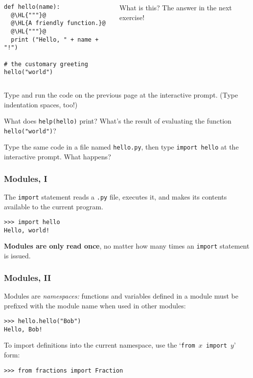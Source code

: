 \documentclass[english,serif,mathserif,xcolor=pdftex,dvipsnames,table]{beamer}
\begin{document}
\begin{frame}[fragile]
  \begin{columns}[t]
    \begin{column}{0.5\textwidth}
\begin{lstlisting}
def hello(name):
  @\HL{"""}@
  @\HL{A friendly function.}@
  @\HL{"""}@
  print ("Hello, " + name + "!")

# the customary greeting
hello("world")
\end{lstlisting}
    \end{column}
    \begin{column}{0.5\textwidth}
      \raggedleft 
      What is this? The answer in the next exercise!
    \end{column}
  \end{columns}
\end{frame}

\begin{frame}
  \begin{exercise}
    Type and run the code on the previous page at the interactive
    prompt. (Type indentation spaces, too!)
    
    What does \texttt{help(hello)} print?  
    What's the result of evaluating the function \texttt{hello("world")}?
  \end{exercise}

  \+
  \begin{exercise}
    Type the same code in a file named \texttt{hello.py}, then type
    \texttt{import hello} at the interactive prompt.
    What happens?
  \end{exercise}  
\end{frame}


\begin{frame}[fragile]
  \frametitle{Modules, I}
  The \texttt{import} statement reads a \texttt{.py} file, executes
  it, and makes its contents available to the current program.
\begin{lstlisting}
>>> import hello
Hello, world!
\end{lstlisting}

  \+
  \textbf{Modules are only read once}, no matter how many times an
  \texttt{import} statement is issued.
\end{frame}


\begin{frame}[fragile]
  \frametitle{Modules, II}
  Modules are \emph{namespaces:} functions and variables defined in
  a module must be prefixed with the module name when used in other
  modules:
\begin{lstlisting}
>>> hello.hello("Bob")
Hello, Bob!
\end{lstlisting}

  \+
  To import definitions into the current namespace, use the
  `\texttt{from $x$ import $y$}' form:
\begin{lstlisting}
>>> from fractions import Fraction
\end{lstlisting}
\end{frame}
\end{document}

